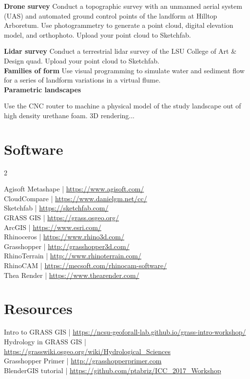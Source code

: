 \documentclass[11pt,article,oneside]{memoir}
\begin{document}
\noindent \textbf{Drone survey}
Conduct a topographic survey 
with an unmanned aerial system (UAS)
and automated ground control points
of the landform at Hilltop Arboretum. 
Use photogrammetry to generate a point cloud, 
digital elevation model, and orthophoto.
Upload your point cloud to Sketchfab.

\noindent \textbf{Lidar survey}
Conduct a terrestrial lidar survey of the 
LSU College of Art \& Design quad. 
Upload your point cloud to Sketchfab.
\\

\noindent \textbf{Families of form}
Use visual programming to 
simulate water and sediment flow 
for a series of landform variations
in a virtual flume. 
\\

\noindent \textbf{Parametric landscapes}



Use the CNC router to machine a physical model
of the study landscape out of high density urethane foam.
3D rendering...\\

\section{Software}
\begin{multicols}{2}
\raggedright
Agisoft Metashape | \url{https://www.agisoft.com/} \\
CloudCompare | \url{https://www.danielgm.net/cc/} \\
Sketchfab | \url{https://sketchfab.com/} \\
GRASS GIS | \url{https://grass.osgeo.org/} \\
ArcGIS | \url{https://www.esri.com/} \\
Rhinoceros | \url{https://www.rhino3d.com/}\\
Grasshopper | \url{http://grasshopper3d.com/}\\
RhinoTerrain | \url{http://www.rhinoterrain.com/}\\
RhinoCAM | \url{https://mecsoft.com/rhinocam-software/}\\
Thea Render | \url{https://www.thearender.com/}\\
\end{multicols}

\section{Resources}
Intro to GRASS GIS | \url{https://ncsu-geoforall-lab.github.io/grass-intro-workshop/}\\
Hydrology in GRASS GIS | \url{https://grasswiki.osgeo.org/wiki/Hydrological_Sciences}\\
Grasshopper Primer | \url{http://grasshopperprimer.com}\\
BlenderGIS tutorial | \url{https://github.com/ptabriz/ICC_2017_Workshop}
\end{document}
